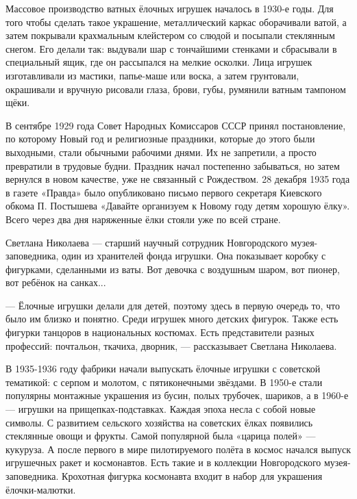 
Массовое производство ватных ёлочных игрушек началось в 1930-е годы. Для того
чтобы сделать такое украшение, металлический каркас оборачивали ватой, а затем
покрывали крахмальным клейстером со слюдой и посыпали стеклянным снегом. Его
делали так: выдували шар с тончайшими стенками и сбрасывали в специальный ящик,
где он рассыпался на мелкие осколки. Лица игрушек изготавливали из мастики,
папье-маше или воска, а затем грунтовали, окрашивали и вручную рисовали глаза,
брови, губы, румянили ватным тампоном щёки.

\begin{zznagolos}
В сентябре 1929 года Совет Народных Комиссаров СССР принял постановление, по которому Новый год и религиозные праздники, которые до этого были выходными, стали обычными рабочими днями. Их не запретили, а просто превратили в трудовые будни. Праздник начал постепенно забываться, но затем вернулся в новом качестве, уже не связанный с Рождеством. 28 декабря 1935 года в газете «Правда» было опубликовано письмо первого секретаря Киевского обкома П. Постышева «Давайте организуем к Новому году детям хорошую ёлку». Всего через два дня наряженные ёлки стояли уже по всей стране.	
\end{zznagolos}

Светлана Николаева — старший научный сотрудник Новгородского музея-заповедника,
один из хранителей фонда игрушки. Она показывает коробку с фигурками,
сделанными из ваты. Вот девочка с воздушным шаром, вот пионер, вот ребёнок на
санках...

\begin{zznagolos}
— Ёлочные игрушки делали для детей, поэтому здесь в первую очередь то, что было
им близко и понятно. Среди игрушек много детских фигурок. Также есть фигурки
танцоров в национальных костюмах. Есть представители разных профессий:
почтальон, ткачиха, дворник, — рассказывает Светлана Николаева.	
\end{zznagolos}

В 1935-1936 году фабрики начали выпускать ёлочные игрушки с советской
тематикой: с серпом и молотом, с пятиконечными звёздами. В 1950-е стали
популярны монтажные украшения из бусин, полых трубочек, шариков, а в 1960-е —
игрушки на прищепках-подставках. Каждая эпоха несла с собой новые символы. С
развитием сельского хозяйства на советских ёлках появились стеклянные овощи и
фрукты. Самой популярной была «царица полей» — кукуруза. А после первого в мире
пилотируемого полёта в космос начался выпуск игрушечных ракет и космонавтов.
Есть такие и в коллекции Новгородского музея-заповедника. Крохотная фигурка
космонавта входит в набор для украшения ёлочки-малютки. 

